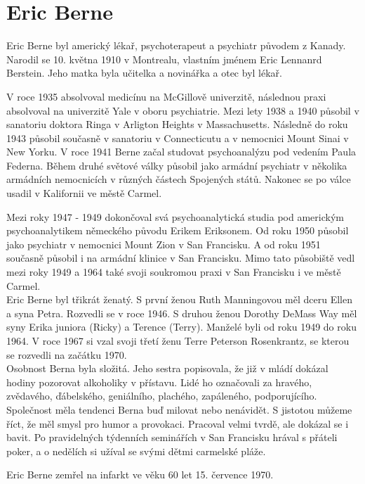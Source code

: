 \chapter{Eric Berne}

Eric Berne byl americký lékař, psychoterapeut a
psychiatr původem z Kanady.
Narodil se 10. května 1910 v Montrealu, vlastním jménem Eric Lennanrd Berstein.
Jeho matka byla učitelka a novinářka a otec byl lékař.

V roce 1935 absolvoval medicínu na McGillově univerzitě, následnou praxi absolvoval na univerzitě Yale v oboru psychiatrie.
Mezi lety 1938 a 1940 působil v sanatoriu doktora Ringa v Arligton Heights v Massachusetts. 
Následně do roku 1943 působil současně v sanatoriu v Connecticutu a v nemocnici Mount Sinai v New Yorku. 
V roce 1941 Berne začal studovat psychoanalýzu pod vedením Paula Federna.
Během druhé světové války působil jako armádní psychiatr v několika armádních nemocnicích v různých částech Spojených států. 
Nakonec se po válce usadil v Kalifornii ve městě Carmel.

Mezi roky 1947 - 1949 dokončoval svá psychoanalytická studia pod americkým psychoanalytikem německého původu Erikem Eriksonem.
Od roku 1950 působil jako psychiatr v nemocnici Mount Zion v San Francisku. 
A od roku 1951 současně působil i na armádní klinice v San Francisku. 
Mimo tato působiště vedl mezi roky 1949 a 1964 také svoji soukromou praxi v San Francisku i ve městě Carmel.\\

Eric Berne byl třikrát ženatý. S první ženou Ruth Manningovou měl dceru Ellen a syna Petra. 
Rozvedli se v roce 1946. S druhou ženou Dorothy DeMass Way měl syny Erika juniora (Ricky) a Terence (Terry).
Manželé byli od roku 1949 do roku 1964. 
V roce 1967 si vzal svoji třetí ženu Terre Peterson Rosenkrantz, se kterou se rozvedli na začátku 1970.\\

Osobnost Berna byla složitá. Jeho sestra popisovala, že již v mládí dokázal hodiny pozorovat alkoholiky v přístavu. 
Lidé ho označovali za hravého, zvědavého, ďábelského, geniálního, plachého, zapáleného, podporujícího. 
Společnost měla tendenci Berna buď milovat nebo nenávidět.
S jistotou můžeme říct, že měl smysl pro humor a provokaci. Pracoval velmi tvrdě, ale dokázal se i bavit. Po pravidelných týdenních seminářích v San Francisku hrával s přáteli poker, a o nedělích si užíval se svými dětmi carmelské pláže.

Eric Berne zemřel na infarkt ve věku 60 let 15. července 1970. \cite{berne_biography_official, berne_biography_eata, berne_wikipedia}

